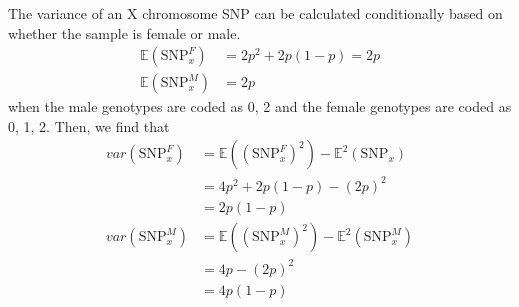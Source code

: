\documentclass[11pt]{article} %
\newcommand{\snpX}{\mbox{SNP}_x}
\newcommand{\snpXM}{\mbox{SNP}_x^M}
\newcommand{\snpXF}{\mbox{SNP}_x^F}
\begin{document}
The variance of an X chromosome SNP can be calculated conditionally based on whether the sample is female or male. 
\begin{align}
\mathbb{E}(\snpXF)&=2p^2+2p(1-p)= 2p\\
\mathbb{E}(\snpXM)&=2p
\end{align} when the male genotypes are coded as 0, 2 and the female genotypes are coded as 0, 1, 2.
Then, we find that
\begin{align}
var(\snpXF)&= \mathbb{E}((\snpXF)^2)-\mathbb{E}^2(\snpX)\\
&=4p^2+2p(1-p)-(2p)^2\\ \label{fem_var}
&=2p(1-p)\\ 
var(\snpXM)&=\mathbb{E}((\snpXM)^2)-\mathbb{E}^2(\snpXM)\\
&=4p-(2p)^2\\
&=4p(1-p) \label{mal_var}
\end{align} 
\end{document}
